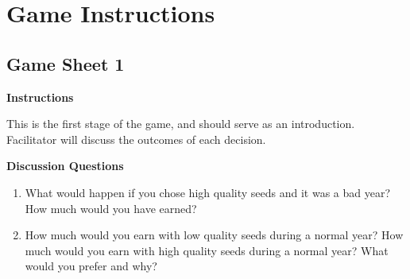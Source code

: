 \documentclass[letterpaper,10pt,english]{sphinxmanual}
\begin{document}
\section{Game Instructions}
\label{games/gameinstructions_quickreference_en:game-instructions}\begin{figure}[htbp]
\centering

\end{figure}


\subsection{Game Sheet 1}
\label{games/gameinstructions_quickreference_en:game-sheet-1}
\textbf{Instructions}

This is the first stage of the game, and should serve as an introduction. Facilitator will discuss the outcomes of each decision.

\textbf{Discussion Questions}
\begin{enumerate}
\item {} 
What would happen if you chose high quality seeds and it was a bad year? How much would you have earned?

\item {} 
How much would you earn with low quality seeds during a normal year? How much would you earn with high quality seeds during a normal year? What would you prefer and why?

\end{enumerate}
\end{document}
